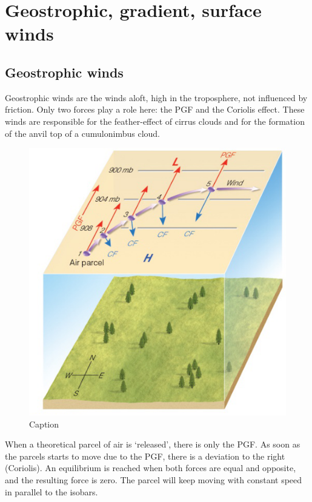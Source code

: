 \documentclass[12pt,oneside]{book}
\begin{document}
\section{Geostrophic, gradient, surface
winds}\label{geostrophic-gradient-surface-winds}

\subsection{Geostrophic winds}\label{geostrophic-winds}

Geostrophic winds are the winds aloft, high in the troposphere, not
influenced by friction. Only two forces play a role here: the PGF and
the Coriolis effect. These winds are responsible for the feather-effect
of cirrus clouds and for the formation of the anvil top of a
cumulonimbus cloud.

\begin{figure}

{\centering \includegraphics[width=0.8\linewidth]{figures/Figure48} 

}

\caption{Caption}\label{fig:Geos}
\end{figure}

When a theoretical parcel of air is `released', there is only the PGF.
As soon as the parcels starts to move due to the PGF, there is a
deviation to the right (Coriolis). An equilibrium is reached when both
forces are equal and opposite, and the resulting force is zero. The
parcel will keep moving with constant speed in parallel to the isobars.
\end{document}
